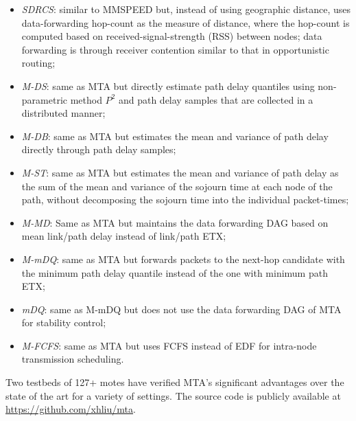 {\begin{itemize}
\item \emph{SDRCS}: similar to MMSPEED but, instead of using geographic distance, uses data-forwarding hop-count as the measure of distance, where the hop-count is computed based on received-signal-strength (RSS) between nodes; data forwarding is through receiver contention similar to that in opportunistic routing;
\item \emph{M-DS}: same as MTA but directly estimate path delay quantiles using non-parametric method $P^2$ and path delay samples that are collected in a distributed manner;
\item \emph{M-DB}: same as MTA but estimates the mean and variance of path delay directly through path delay samples; \item \emph{M-ST}: same as MTA but estimates the mean and variance of path delay as the sum of the mean and variance of the sojourn time  at each node of the path, without decomposing the sojourn time into the individual packet-times;
\item \emph{M-MD}: Same as MTA but maintains the data forwarding DAG based on mean link/path delay instead of link/path ETX;
\item \emph{M-mDQ}: same as MTA but forwards packets to the next-hop candidate with the minimum path delay quantile instead of the one with minimum path ETX;
\item \emph{mDQ}: same as M-mDQ but does not use the data forwarding DAG of MTA for stability control;
\item \emph{M-FCFS}: same as MTA but uses FCFS instead of EDF for intra-node transmission scheduling.
\end{itemize}
Two testbeds of 127+ motes have verified MTA's significant advantages over the state of the art for a variety of settings.
The source code is publicly available at \url{https://github.com/xhliu/mta}.
}

